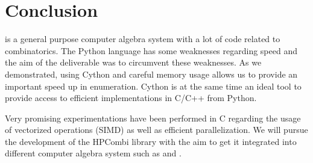 \documentclass{deliverablereport}
\begin{document}

\section{Conclusion}
\Sage is a general purpose computer algebra system with a lot of code related
to combinatorics. The Python language has some weaknesses regarding speed and the
aim of the deliverable was to circumvent these weaknesses. As we demonstrated,
using Cython and careful memory usage allows us to provide an
important speed up in enumeration. Cython is at the same time an ideal
tool to provide access to efficient implementations in C/C++ from Python.

Very promising experimentations have been performed in C regarding the usage
of vectorized operations (SIMD) as well as efficient parallelization. We will
pursue the development of the HPCombi library with the aim to get it
integrated into different computer algebra system such as \Sage and \GAP.

\printbibliography
\end{document}
